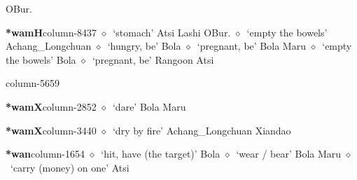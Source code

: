          OBur. 
  \item {\footnotesize \textbf{*wamH}}{\tiny column-8437}
         $\diamond$~`stomach'
         Atsi 
\hspace{1ex}
         Lashi 
\hspace{1ex}
         OBur. 
\hspace{1ex}
         $\diamond$~`empty the bowels'
         Achang\_Longchuan 
\hspace{1ex}
         $\diamond$~`hungry, be'
         Bola 
\hspace{1ex}
         $\diamond$~`pregnant, be'
         Bola 
\hspace{1ex}
         Maru 
\hspace{1ex}
         $\diamond$~`empty the bowels'
         Bola 
\hspace{1ex}
         $\diamond$~`pregnant, be'
         Rangoon 
\hspace{1ex}
         Atsi 
  \item {\footnotesize \textbf{}}{\tiny column-5659}
  \item {\footnotesize \textbf{*wamX}}{\tiny column-2852}
         $\diamond$~`dare'
         Bola 
\hspace{1ex}
         Maru 
  \item {\footnotesize \textbf{*wamX}}{\tiny column-3440}
         $\diamond$~`dry by fire'
         Achang\_Longchuan 
\hspace{1ex}
         Xiandao 
  \item {\footnotesize \textbf{*wan}}{\tiny column-1654}
         $\diamond$~`hit, have (the target)'
         Bola 
\hspace{1ex}
         $\diamond$~`wear / bear'
         Bola 
\hspace{1ex}
         Maru 
\hspace{1ex}
         $\diamond$~`carry (money) on one'
         Atsi 
